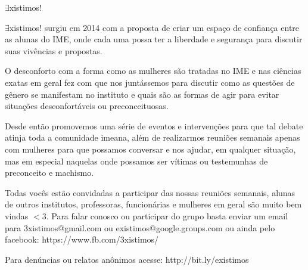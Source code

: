 \begin{subsecao}{$\exists$xistimos!}


$\exists$xistimos! surgiu em  2014 com a proposta de criar um espaço de
confiança entre as alunas do IME, onde cada uma possa ter a liberdade e
segurança para discutir suas vivências e propostas.

O desconforto com a forma como as mulheres são tratadas no IME e nas ciências
exatas em geral fez com que nos juntássemos para discutir como as questões de
gênero se manifestam no instituto e quais são as formas de agir para evitar
situações desconfortáveis ou preconceituosas.

Desde então promovemos uma série de eventos e intervenções para que tal debate
atinja toda a comunidade imeana, além de realizarmos reuniões semanais apenas
com mulheres para que possamos conversar e nos ajudar, em qualquer situação,
mas em especial naquelas onde possamos ser vítimas ou testemunhas de
preconceito e machismo.

Todas vocês estão convidadas a participar das nossas reuniões semanais, alunas
de outros institutos, professoras, funcionárias e mulheres em geral são muito
bem vindas $<$3. Para falar conosco ou participar do grupo basta enviar um email
para 3xistimos@gmail.com ou existimos@google.groups.com ou ainda pelo facebook:
https://www.fb.com/3xistimos/

Para denúncias ou relatos anônimos acesse: http://bit.ly/existimos
\end{subsecao}
